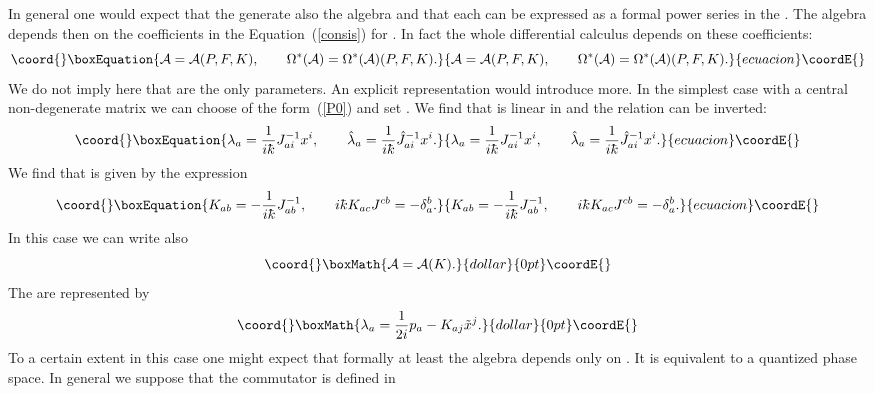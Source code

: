 \documentclass[a4paper,12pt]{article}
\def\h#1{\hat #1}
\def\t#1{\tilde #1}
\def\c#1{{\cal #1}}
\def\kbar{{\mathchar'26\mkern-9muk}}
\def\t#1{\tilde #1}
\begin{document}
In general one would expect that the \coordHE{} generate also the
algebra and that each \coordHE{} can be expressed as a formal power series
in the \coordHE{}. The algebra depends then on the coefficients in
the Equation~(\ref{consis}) for \coordHE{}. In fact the whole
differential calculus depends on these coefficients:
\begin{equation}\coord{}\boxEquation{
\c{A} = \c{A}(P,F,K), \qquad
\Omega^*(\c{A}) = \Omega^*(\c{A})(P,F,K).                    \label{P-F-K}
}{
\c{A} = \c{A}(P,F,K), \qquad
\Omega^*(\c{A}) = \Omega^*(\c{A})(P,F,K).                    }{ecuacion}\coordE{}\end{equation}
We do not imply here that \coordHE{} 
are the only parameters. An explicit representation would introduce more.
In the simplest case with \coordHE{} a central non-degenerate matrix we
can choose \coordHE{} of the form~(\ref{P0}) and set 
\coordHE{}. We find that \coordHE{} is linear in \coordHE{} and the
relation can be inverted:
\begin{equation}\coord{}\boxEquation{
\lambda_a = \frac 1{i\kbar} J^{-1}_{ai} x^i, \qquad
\h{\lambda}_a = \frac 1{i\kbar} \h{J}^{-1}_{ai} x^i.           \label{l-x}
}{
\lambda_a = \frac 1{i\kbar} J^{-1}_{ai} x^i, \qquad
\h{\lambda}_a = \frac 1{i\kbar} \h{J}^{-1}_{ai} x^i.           }{ecuacion}\coordE{}\end{equation}
We find that \coordHE{} is given by the expression
\begin{equation}\coord{}\boxEquation{
K_{ab} = - \frac 1{i\kbar} J^{-1}_{ab},\qquad
i \kbar K_{ac} J^{cb} = - \delta_a^b.                          \label{K-J}
}{
K_{ab} = - \frac 1{i\kbar} J^{-1}_{ab},\qquad
i \kbar K_{ac} J^{cb} = - \delta_a^b.                          }{ecuacion}\coordE{}\end{equation}
In this case we can write also
$$\coord{}\boxMath{
\c{A} = \c{A}(K).
}{dollar}{0pt}\coordE{}$$
The \coordHE{} are represented by
$$\coord{}\boxMath{
\lambda_a = \frac1{2i} p_a - K_{aj} \t{x}^j.
}{dollar}{0pt}\coordE{}$$
To a certain extent in this case one might expect that formally at
least the algebra depends only on \coordHE{}. It is equivalent to a quantized
phase space.  In general we suppose that the commutator is defined in
\end{document}
